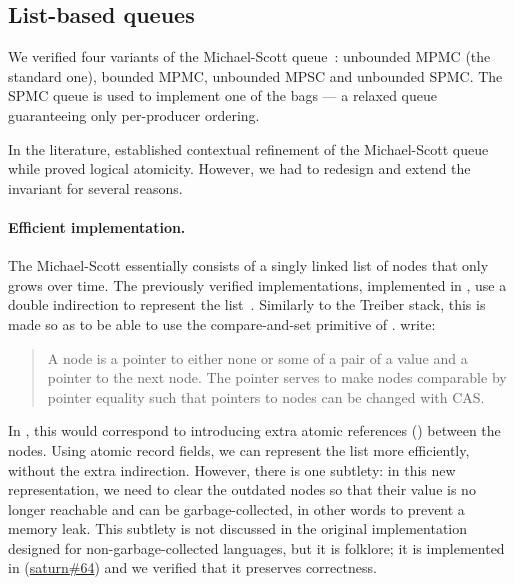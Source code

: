 \subsection{List-based queues}

We verified four variants of the Michael-Scott queue~\citep*{DBLP:conf/podc/MichaelS96}: unbounded MPMC (the standard one), bounded MPMC, unbounded MPSC and unbounded SPMC.
The SPMC queue is used to implement one of the bags --- a relaxed queue guaranteeing only per-producer ordering.

In the \Iris literature, \citet*{DBLP:conf/cpp/VindumB21} established contextual refinement of the Michael-Scott queue while \citet*{DBLP:journals/pacmpl/MulderK23} proved logical atomicity.
However, we had to redesign and extend the invariant for several reasons.

\paragraph{Efficient implementation.}\label{par:michael-scott-cleanup}
The Michael-Scott essentially consists of a singly linked list of nodes that only grows over time.
The previously verified implementations, implemented in \HeapLang, use a double indirection to represent the list~\citep*[\figurename~2]{DBLP:conf/cpp/VindumB21}.
Similarly to the Treiber stack, this is made so as to be able to use the compare-and-set primitive of \HeapLang. \citet*{DBLP:conf/cpp/VindumB21} write:
\begin{quotation}
  A node is a pointer to either none or some of a pair of a value and a pointer to the next node.
  The pointer serves to make nodes comparable by pointer equality such that pointers to nodes can be changed with CAS.
\end{quotation}
In \OCaml, this would correspond to introducing extra atomic references () between the nodes.
Using atomic record fields, we can represent the list more efficiently, without the extra indirection.
However, there is one subtlety: in this new representation, we need to clear the outdated nodes so that their value is no longer reachable and can be garbage-collected, in other words to prevent a memory leak.
This subtlety is not discussed in the original implementation~\citep*{DBLP:conf/podc/MichaelS96} designed for non-garbage-collected languages, but it is folklore; it is implemented in \Saturn (\href{https://github.com/ocaml-multicore/saturn/pull/64}{saturn\#64}) and we verified that it preserves correctness.

